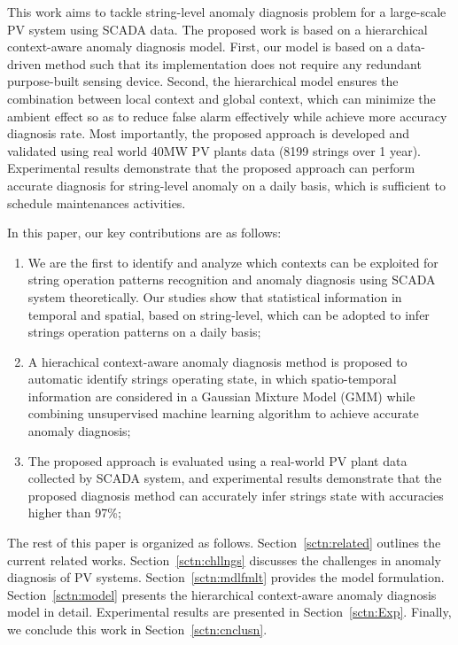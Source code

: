 \documentclass[journal]{IEEEtran}
\begin{document}
This work aims to tackle string-level anomaly diagnosis problem for a large-scale PV system using SCADA data. The proposed work is based on a hierarchical context-aware anomaly diagnosis model. First, our model is based on a data-driven method such that its implementation does not require any redundant purpose-built sensing device. Second, the hierarchical model ensures the combination between local context and global context, which can minimize the ambient effect so as to reduce false alarm effectively while achieve more accuracy diagnosis rate. Most importantly, the proposed approach is developed and validated using real world 40MW PV plants data (8199 strings over 1 year). Experimental results demonstrate that the proposed approach can perform accurate diagnosis for string-level anomaly on a daily basis, which is sufficient to schedule maintenances activities. 

In this paper, our key contributions are as follows:
\begin{enumerate}
\item We are the first to identify and analyze which contexts can be exploited for string operation patterns recognition and anomaly diagnosis using SCADA system theoretically. Our studies show that statistical information in temporal and spatial, based on string-level, which can be adopted to infer strings operation patterns on a daily basis; 
\item A hierachical context-aware anomaly diagnosis method is proposed to automatic identify strings operating state, in which spatio-temporal information are considered in a Gaussian Mixture Model (GMM) while combining unsupervised machine learning algorithm to achieve accurate anomaly diagnosis; 
\item The proposed approach is evaluated using a real-world PV plant data collected by SCADA system, and experimental results demonstrate that the proposed diagnosis method can accurately infer strings state with accuracies higher than \textcolor[rgb]{1,0,0}{97\%}; 
\end{enumerate}

The rest of this paper is organized as follows.
Section~\ref{sctn:related} outlines the current related works.
Section~\ref{sctn:chllngs} discusses the challenges in anomaly diagnosis of PV systems.
Section~\ref{sctn:mdlfmlt} provides the model formulation.
Section~\ref{sctn:model} presents the hierarchical context-aware anomaly diagnosis model in detail.
Experimental results are presented in Section~\ref{sctn:Exp}.
Finally, we conclude this work in Section~\ref{sctn:cnclusn}.
\end{document}

